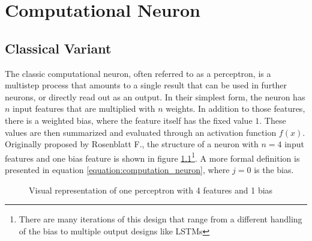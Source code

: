 \chapter{Computational Neuron} %

\label{chapter:computational_neuron} %


\newcommand{\keyword}[1]{\textbf{#1}}
\newcommand{\tabhead}[1]{\textbf{#1}}
\newcommand{\code}[1]{\texttt{#1}}
\newcommand{\file}[1]{\texttt{\bfseries#1}}
\newcommand{\option}[1]{\texttt{\itshape#1}}


\section{Classical Variant}
The classic computational neuron, often referred to as a perceptron, is a multistep process that amounts to a single result that can be used in further neurons, or directly read out as an output. In their simplest form, the neuron has $n$ input features that are multiplied with $n$ weights. In addition to those features, there is a weighted bias, where the feature itself has the fixed value $1$. These values are then summarized and evaluated through an activation function $f(x)$. Originally proposed by Rosenblatt F.\cite{rosenblatt_perceptron_1958}, the structure of a neuron with $n = 4$ input features and one bias feature is shown in figure \ref{figure:computation_neuron}\footnote{There are many iterations of this design that range from a different handling of the bias to multiple output designs like LSTMs\cite{lstm}}. A more formal definition is presented in equation \ref{equation:computation_neuron}, where $j=0$ is the bias.

\begin{figure}[h!]
    \centering
    \caption{Visual representation of one perceptron with 4 features and 1 bias}
    \label{figure:computation_neuron}
\end{figure}

